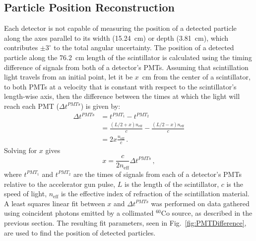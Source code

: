 \documentclass[%
 reprint,
 calc,
 amsmath,amssymb,
 aps,
 nofootinbib,
 linenumbers
]{revtex4-1}
\begin{document}
\subsection{Particle Position Reconstruction}
Each detector is not capable of measuring the position of a detected particle along the axes parallel to its width (15.24~cm) or depth (3.81~cm), which contributes $\pm3^{\circ}$ to the total angular uncertainty.
The position of a detected particle along the 76.2~cm length of the scintillator is calculated using the timing difference of signals from both of a detector's PMTs.
Assuming that scintillation light travels from an initial point, let it be $x$~cm from the center of a scintillator, to both PMTs at a velocity that is constant with respect to the scintillator's length-wise axis, then the difference between the times at which the light will reach each PMT ($\Delta t^{PMTs}$) is given by:
\begin{equation}
\label{eq:PMTDiff1}
\begin{split}
\Delta t^{PMTs} & = t^{PMT_1}-t^{PMT_2} \\ 
& = \frac{(L/2 + x) n_{\text{eff}}}{c} - \frac{(L/2-x) n_{\text{eff}}}{c} \\
& = 2x \frac{n_{\text{eff}}}{c}  \, .
\end{split}
\end{equation}
Solving for $x$ gives 
\begin{equation}
\label{eq:position}
x = \frac{c}{2n_{\text{eff}}} \Delta t^{PMTs} \, ,
\end{equation}
where $t^{PMT_{1}}$ and $t^{PMT_{2}}$ are the times of signals from each of a detector's PMTs relative to the accelerator gun pulse, $L$ is the length of the scintillator, $c$ is the speed of light, $n_{\text{eff}}$ is the effective index of refraction of the scintillation material.
A least squares linear fit between $x$ and $\Delta t^{PMTs}$ was performed on data gathered using coincident photons emitted by a collimated $^{60}$Co source, as described in the previous section.
The resulting fit parameters, seen in Fig.~\ref{fig:PMTDifference}, are used to find the position of detected particles.
\end{document}
